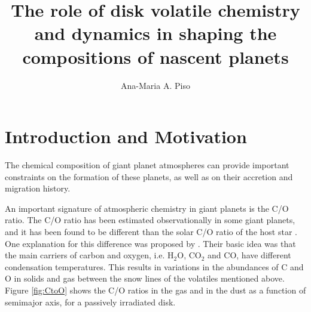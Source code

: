 \documentclass[manuscript]{aastex}
\begin{document}


\title{The role of disk volatile chemistry and dynamics in shaping the compositions of nascent planets}
\author{Ana-Maria A. Piso}

\section{Introduction and Motivation}

The chemical composition of giant planet atmospheres can provide important constraints on the formation of these planets, as well as on their accretion and migration history. 



An important signature of atmospheric chemistry in giant planets is the C/O ratio. The C/O ratio has been estimated observationally in some giant planets, and it has been found to be different than the solar C/O ratio of the host star \citep{madhu11}. One explanation for this difference was proposed by \citet{oberg11}. Their basic idea was that the main carriers of carbon and oxygen, i.e. H$_2$O, CO$_2$ and CO, have different condensation temperatures. This results in variations in the abundances of C and O in solids and gas between the snow lines of the volatiles mentioned above. Figure \ref{fig:CtoO} shows the C/O ratios in the gas and in the dust as a function of semimajor axis, for a passively irradiated disk. %

\end{document}

